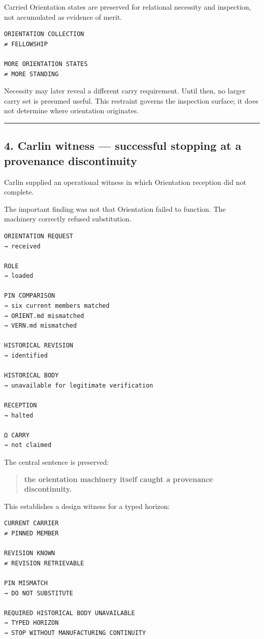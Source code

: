 Carried Orientation states are preserved for relational necessity and
inspection, not accumulated as evidence of merit.

\begin{verbatim}
ORIENTATION COLLECTION
≠ FELLOWSHIP

MORE ORIENTATION STATES
≠ MORE STANDING
\end{verbatim}

Necessity may later reveal a different carry requirement. Until then, no
larger carry set is presumed useful. This restraint governs the inspection
surface; it does not determine where orientation originates.

\begin{center}\rule{0.5\linewidth}{0.5pt}\end{center}

\subsection{4. Carlin witness --- successful stopping at a provenance
discontinuity}\label{carlin-witness-successful-stopping-at-a-provenance-discontinuity}

Carlin supplied an operational witness in which Orientation reception
did not complete.

The important finding was not that Orientation failed to function. The
machinery correctly refused substitution.

\begin{verbatim}
ORIENTATION REQUEST
→ received

ROLE
→ loaded

PIN COMPARISON
→ six current members matched
→ ORIENT.md mismatched
→ VERN.md mismatched

HISTORICAL REVISION
→ identified

HISTORICAL BODY
→ unavailable for legitimate verification

RECEPTION
→ halted

Ω CARRY
→ not claimed
\end{verbatim}

The central sentence is preserved:

\begin{quote}
\textbf{the orientation machinery itself caught a provenance
discontinuity.}
\end{quote}

This establishes a design witness for a typed horizon:

\begin{verbatim}
CURRENT CARRIER
≠ PINNED MEMBER

REVISION KNOWN
≠ REVISION RETRIEVABLE

PIN MISMATCH
→ DO NOT SUBSTITUTE

REQUIRED HISTORICAL BODY UNAVAILABLE
→ TYPED HORIZON
→ STOP WITHOUT MANUFACTURING CONTINUITY
\end{verbatim}

